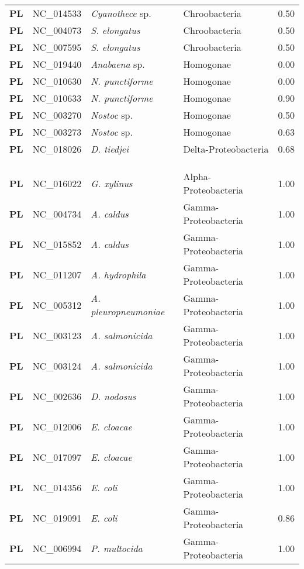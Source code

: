 \begin{adjustwidth}{-3cm}{2cm}
{\begin{supertabular}{>{\bfseries}l|p{0.1\textwidth}p{0.14\textwidth}l|l}
PL & NC\_014533 & \textit{Cyanothece} sp. & Chroobacteria & 0.50\\
PL & NC\_004073 & \textit{S. elongatus} & Chroobacteria & 0.50\\
PL & NC\_007595 & \textit{S. elongatus} & Chroobacteria & 0.50\\
PL & NC\_019440 & \textit{Anabaena} sp. & Homogonae & 0.00\\
PL & NC\_010630 & \textit{N. punctiforme} & Homogonae & 0.00\\
PL & NC\_010633 & \textit{N. punctiforme} & Homogonae & 0.90\\
PL & NC\_003270 & \textit{Nostoc} sp. & Homogonae & 0.50\\
PL & NC\_003273 & \textit{Nostoc} sp. & Homogonae & 0.63\\
PL & NC\_018026 & \textit{D. tiedjei} & Delta-Proteobacteria & 0.68\\
\\
\\
\hline\\
PL & NC\_016022 & \textit{G. xylinus} & Alpha-Proteobacteria & 1.00\\
PL & NC\_004734 & \textit{A. caldus} & Gamma-Proteobacteria & 1.00\\
PL & NC\_015852 & \textit{A. caldus} & Gamma-Proteobacteria & 1.00\\
PL & NC\_011207 & \textit{A. hydrophila} & Gamma-Proteobacteria & 1.00\\
PL & NC\_005312 & \textit{A. pleuropneumoniae} & Gamma-Proteobacteria & 1.00\\
PL & NC\_003123 & \textit{A. salmonicida} & Gamma-Proteobacteria & 1.00\\
PL & NC\_003124 & \textit{A. salmonicida} & Gamma-Proteobacteria & 1.00\\
PL & NC\_002636 & \textit{D. nodosus} & Gamma-Proteobacteria & 1.00\\
PL & NC\_012006 & \textit{E. cloacae} & Gamma-Proteobacteria & 1.00\\
PL & NC\_017097 & \textit{E. cloacae} & Gamma-Proteobacteria & 1.00\\
PL & NC\_014356 & \textit{E. coli} & Gamma-Proteobacteria & 1.00\\
PL & NC\_019091 & \textit{E. coli} & Gamma-Proteobacteria & 0.86\\
PL & NC\_006994 & \textit{P. multocida} & Gamma-Proteobacteria & 1.00\\

\end{supertabular}}
\end{adjustwidth}
